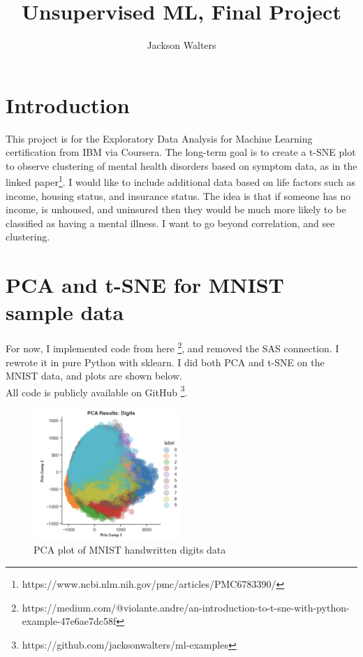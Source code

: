 \documentclass[11pt]{amsart}
\title{Unsupervised ML, Final Project}
\author{Jackson Walters}
\date{}                                           %
\begin{document}
\maketitle

\section{Introduction}

This project is for the Exploratory Data Analysis for Machine Learning certification from IBM via Coursera. The long-term goal is to create a t-SNE plot to observe clustering of mental health disorders based on symptom data, as in the linked paper\footnote{https://www.ncbi.nlm.nih.gov/pmc/articles/PMC6783390/}. I would like to include additional data based on life factors such as income, housing status, and insurance status. The idea is that if someone has no income, is unhoused, and uninsured then they would be much more likely to be classified as having a mental illness. I want to go beyond correlation, and see clustering. \\


\section{PCA and t-SNE for MNIST sample data}

For now, I implemented code from here \footnote{https://medium.com/@violante.andre/an-introduction-to-t-sne-with-python-example-47e6ae7dc58f}, and removed the SAS connection. I rewrote it in pure Python with sklearn. I did both PCA and t-SNE on the MNIST data, and plots are shown below. \\

All code is publicly available on GitHub \footnote{https://github.com/jacksonwalters/ml-examples}.

\begin{figure}[h]
\caption{PCA plot of MNIST handwritten digits data}
\centering
\includegraphics[width=0.5\textwidth]{PCA_plot_MNIST}
\end{figure}
\end{document}
